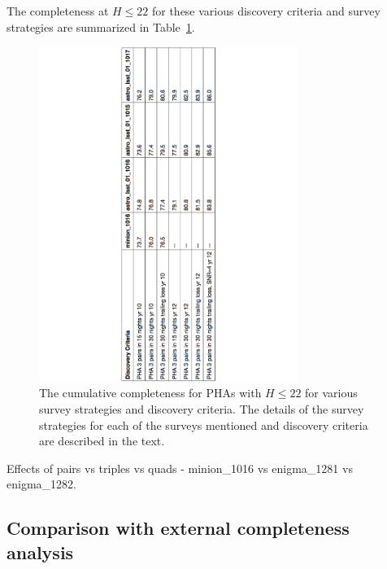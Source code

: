 The completeness at $H\le22$ for these various discovery criteria and survey strategies are summarized in Table~\ref{tab:completeness}. 

\begin{figure}
\centering
\includegraphics[width=0.75\textwidth]{figures/PHA_cumulative_completeness}
\caption{The cumulative completeness for PHAs with $H\le22$ for various survey strategies and discovery criteria. The details of the survey strategies for each of the surveys mentioned and discovery criteria are described in the text.
\label{tab:completeness}}
\end{figure}



Effects of pairs vs triples vs quads - minion\_1016 vs enigma\_1281 vs enigma\_1282.


\subsection{Comparison with external completeness analysis}

